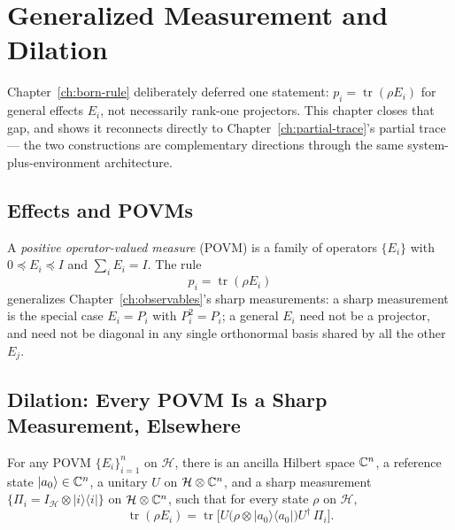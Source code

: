 \chapter{Generalized Measurement and Dilation}
\label{ch:povm}

Chapter~\ref{ch:born-rule} deliberately deferred one statement:
$p_i=\operatorname{tr}(\rho E_i)$ for general effects $E_i$, not necessarily
rank-one projectors. This chapter closes that gap, and shows it reconnects
directly to Chapter~\ref{ch:partial-trace}'s partial trace — the two
constructions are complementary directions through the same
system-plus-environment architecture.

\section{Effects and POVMs}

\begin{definition}[POVM]
\label{def:povm}
A \emph{positive operator-valued measure} (POVM) is a family of operators
$\{E_i\}$ with $0 \preceq E_i \preceq I$ and $\sum_i E_i = I$. The rule
\begin{equation}
p_i = \operatorname{tr}(\rho E_i)
\end{equation}
generalizes Chapter~\ref{ch:observables}'s sharp measurements: a sharp
measurement is the special case $E_i = P_i$ with $P_i^2=P_i$; a general
$E_i$ need not be a projector, and need not be diagonal in any single
orthonormal basis shared by all the other $E_j$.
\end{definition}

\section{Dilation: Every POVM Is a Sharp Measurement, Elsewhere}

\begin{theorem}
\label{thm:naimark}
For any POVM $\{E_i\}_{i=1}^n$ on $\mathcal H$, there is an ancilla Hilbert
space $\mathbb{C}^n$, a reference state $|a_0\rangle \in \mathbb{C}^n$, a unitary $U$ on
$\mathcal H \otimes \mathbb{C}^n$, and a sharp measurement $\{\Pi_i = I_{\mathcal H}
\otimes |i\rangle\langle i|\}$ on $\mathcal H\otimes\mathbb{C}^n$, such that for every
state $\rho$ on $\mathcal H$,
\begin{equation}
\operatorname{tr}(\rho E_i) = \operatorname{tr}\Big[U\big(\rho \otimes
|a_0\rangle\langle a_0|\big)U^\dagger\, \Pi_i\Big].
\end{equation}
\end{theorem}

